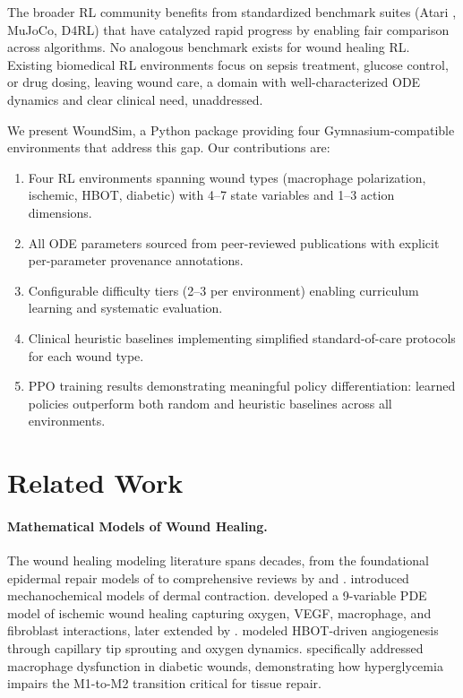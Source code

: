 \documentclass[11pt,a4paper]{article}
\begin{document}
The broader RL community benefits from standardized benchmark suites (Atari \citep{gymnasium}, MuJoCo, D4RL) that have catalyzed rapid progress by enabling fair comparison across algorithms. No analogous benchmark exists for wound healing RL. Existing biomedical RL environments focus on sepsis treatment, glucose control, or drug dosing, leaving wound care, a domain with well-characterized ODE dynamics and clear clinical need, unaddressed.

We present WoundSim, a Python package providing four Gymnasium-compatible environments that address this gap. Our contributions are:
\begin{enumerate}
    \item Four RL environments spanning wound types (macrophage polarization, ischemic, HBOT, diabetic) with 4--7 state variables and 1--3 action dimensions.
    \item All ODE parameters sourced from peer-reviewed publications with explicit per-parameter provenance annotations.
    \item Configurable difficulty tiers (2--3 per environment) enabling curriculum learning and systematic evaluation.
    \item Clinical heuristic baselines implementing simplified standard-of-care protocols for each wound type.
    \item PPO training results demonstrating meaningful policy differentiation: learned policies outperform both random and heuristic baselines across all environments.
\end{enumerate}

\section{Related Work}

\paragraph{Mathematical Models of Wound Healing.}
The wound healing modeling literature spans decades, from the foundational epidermal repair models of \citet{sherratt1990} to comprehensive reviews by \citet{menon2017} and \citet{gomez2019}. \citet{olsen1995} introduced mechanochemical models of dermal contraction. \citet{xue2009} developed a 9-variable PDE model of ischemic wound healing capturing oxygen, VEGF, macrophage, and fibroblast interactions, later extended by \citet{friedman2009}. \citet{flegg2009, flegg2010} modeled HBOT-driven angiogenesis through capillary tip sprouting and oxygen dynamics. \citet{waugh2006} specifically addressed macrophage dysfunction in diabetic wounds, demonstrating how hyperglycemia impairs the M1-to-M2 transition critical for tissue repair.
\end{document}
